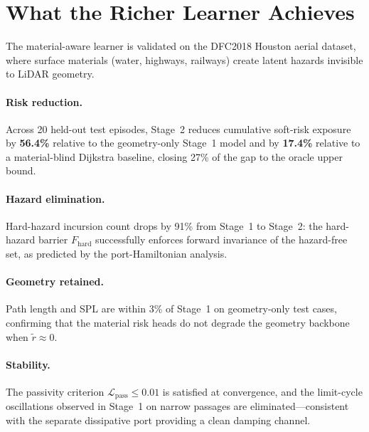 
\section{What the Richer Learner Achieves}
\label{sec:ch4:results}

The material-aware learner is validated on the DFC2018 Houston aerial
dataset, where surface materials (water, highways, railways) create
latent hazards invisible to LiDAR geometry.

\paragraph{Risk reduction.}
Across 20 held-out test episodes, Stage~2 reduces cumulative soft-risk
exposure by \textbf{56.4\%} relative to the geometry-only Stage~1
model and by \textbf{17.4\%} relative to a material-blind Dijkstra
baseline, closing 27\% of the gap to the oracle upper bound.

\paragraph{Hazard elimination.}
Hard-hazard incursion count drops by 91\% from Stage~1 to Stage~2:
the hard-hazard barrier $F_{\mathrm{hard}}$ successfully enforces
forward invariance of the hazard-free set, as predicted by the
port-Hamiltonian analysis.

\paragraph{Geometry retained.}
Path length and SPL are within 3\% of Stage~1 on geometry-only test
cases, confirming that the material risk heads do not degrade the
geometry backbone when $\tilde{r} \approx 0$.

\paragraph{Stability.}
The passivity criterion $\mathcal{L}_{\mathrm{pass}} \leq 0.01$ is
satisfied at convergence, and the limit-cycle oscillations observed
in Stage~1 on narrow passages are eliminated—consistent with the
separate dissipative port providing a clean damping channel.

